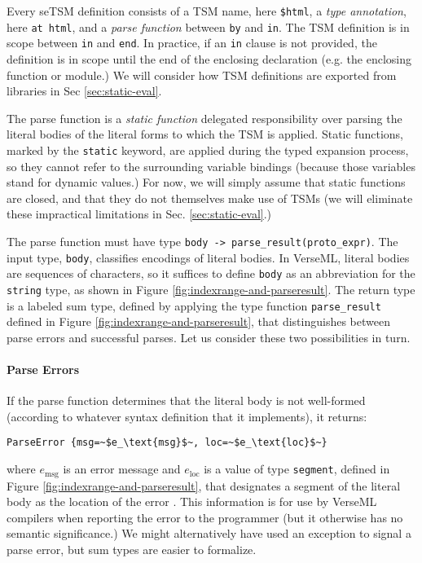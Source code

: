 \documentclass[acmlarge,review,anonymous]{acmart}\settopmatter{printfolios=true}
\newcommand{\li}[1]{\lstinline{#1}}
\begin{document}
Every seTSM definition consists of a TSM name, here \li{$html}, a \emph{type annotation}, here \lstinline{at html}, and a \emph{parse function} between \li{by} and \li{in}. The TSM definition is in scope between \li{in} and \li{end}. In practice, if an \li{in} clause is not provided, the definition is in scope until the end of the enclosing declaration (e.g. the enclosing function or module.) We will consider how TSM definitions are exported from libraries in Sec \ref{sec:static-eval}.


The {parse function} is a \emph{static function} delegated responsibility over parsing the literal bodies of the literal forms to which the TSM is applied. Static functions, marked by the \li{static} keyword, are applied during the typed expansion process, so they cannot refer to the surrounding variable bindings (because those variables stand for dynamic values.) For now, we will simply assume that static functions are closed, and that they do not themselves make use of TSMs (we will eliminate these impractical limitations in Sec. \ref{sec:static-eval}.)

The parse function must have type \li{body -> parse_result(proto_expr)}. The input type, \lstinline{body}, classifies encodings of literal {bodies}. In VerseML, literal bodies are sequences of characters, so it suffices to define \li{body} as an abbreviation for the \li{string} type, as shown in Figure \ref{fig:indexrange-and-parseresult}. The return type is a labeled sum type, defined by applying the type function \li{parse_result} defined in Figure \ref{fig:indexrange-and-parseresult}, that distinguishes between parse errors and successful parses.
Let us consider these two possibilities in turn.

\paragraph{Parse Errors} If the parse function determines that the literal body is not well-formed (according to whatever syntax definition that it implements), it returns:
\begin{lstlisting}[numbers=none]
  ParseError {msg=~$e_\text{msg}$~, loc=~$e_\text{loc}$~}
\end{lstlisting}
where $e_\text{msg}$ is an error message and $e_\text{loc}$ is a value of type \li{segment}, defined in Figure \ref{fig:indexrange-and-parseresult}, that designates a segment of the literal body as the location of the error \cite{DBLP:journals/jsc/DeursenKT93}. This information is for use by VerseML compilers when reporting the error to the programmer (but it otherwise has no semantic significance.) We might alternatively have used an exception to signal a parse error, but sum types are easier to formalize.
\end{document}
